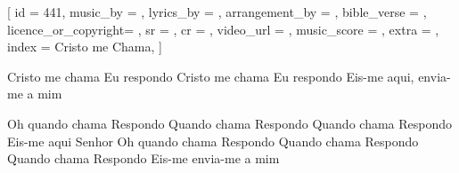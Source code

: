 [
    id                  = {441},
    music_by            = {}, %
    lyrics_by           = {}, %
    arrangement_by      = {}, %
    bible_verse         = {},
    licence_or_copyright= {},
    sr                  = {},
    cr                  = {},
    video_url           = {},
    music_score         = {}, 
    extra               = {},
    index               = {Cristo me Chama},
]

\beginverse
Cristo me chama
Eu respondo
Cristo me chama
Eu respondo
Eis-me aqui, envia-me a mim
\endverse

\beginchorus
Oh quando chama
Respondo
Quando chama
Respondo
Quando chama
Respondo
Eis-me aqui Senhor
Oh quando chama
Respondo
Quando chama
Respondo
Quando chama
Respondo
Eis-me envia-me a mim
\endchorus

\endsong
